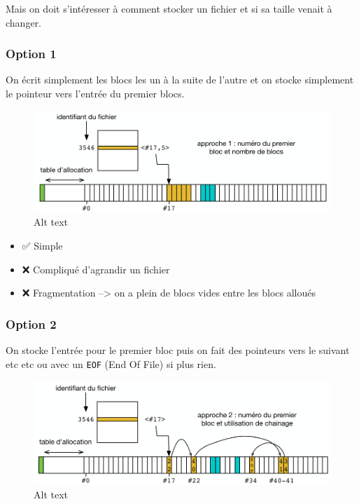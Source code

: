 Mais on doit s'intéresser à comment stocker un fichier et si sa taille
venait à changer.

\subsubsection{Option 1}\label{option-1}

On écrit simplement les blocs les un à la suite de l'autre et on stocke
simplement le pointeur vers l'entrée du premier blocs.

\begin{figure}
\centering
\includegraphics{image-41.png}
\caption{Alt text}
\end{figure}

\begin{itemize}
\tightlist
\item
  ✅ Simple
\item
  ❌ Compliqué d'agrandir un fichier
\item
  ❌ Fragmentation --\textgreater{} on a plein de blocs vides entre les
  blocs alloués
\end{itemize}

\subsubsection{Option 2}\label{option-2}

On stocke l'entrée pour le premier bloc puis on fait des pointeurs vers
le suivant etc etc ou avec un \texttt{EOF} (End Of File) si plus rien.

\begin{figure}
\centering
\includegraphics{image-42.png}
\caption{Alt text}
\end{figure}

